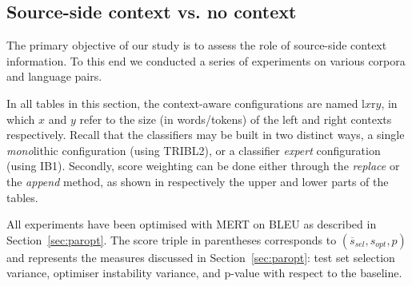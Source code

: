 \subsection{Source-side context vs. no context}
\label{sec:results1}

The primary objective of our study is to assess the role of source-side context
information. To this end we conducted a series of experiments on various
corpora and language pairs.

In all tables in this section, the context-aware configurations are named
l$x$r$y$, in which $x$ and $y$ refer to the size (in words/tokens) of the left and right contexts
respectively.  Recall that the classifiers may be built in two distinct ways, a
single \emph{mono}lithic configuration (using TRIBL2), or a classifier
\emph{expert} configuration (using IB1).  Secondly, score weighting can
be done either through the \emph{replace}  or the \emph{append} method, as
shown in respectively the upper and lower parts of the tables.

All experiments have been optimised with MERT on BLEU as described in
Section~\ref{sec:paropt}.  The score triple in parentheses corresponds to
$(\overline{s}_{sel},s_{opt},p)$ and represents the measures discussed in
Section~\ref{sec:paropt}: test set selection variance, optimiser instability
variance, and p-value with respect to the baseline.


